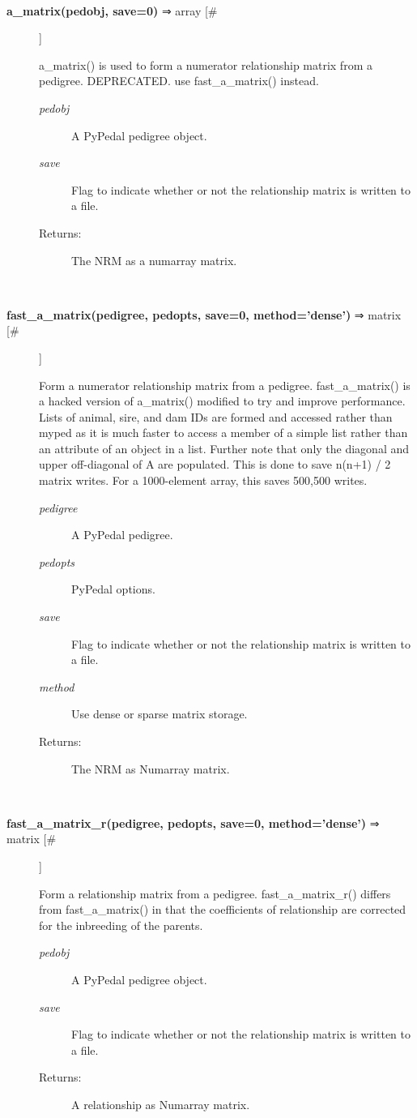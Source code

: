 \documentclass[10pt]{article}
\begin{document}
\begin{description}
\begin{description}
\end{description}
\\ 

\item[\textbf{a\_matrix(pedobj, save=0)}
 ⇒ array [\#]]

 a\_matrix() is used to form a numerator relationship matrix from a pedigree. DEPRECATED. use fast\_a\_matrix() instead.
\begin{description}
\item[\emph{pedobj}
] A PyPedal pedigree object.
\item[\emph{save}
] Flag to indicate whether or not the relationship matrix is written to a file.
\item[Returns:] The NRM as a numarray matrix.

\end{description}
\\ 

\item[\textbf{fast\_a\_matrix(pedigree, pedopts, save=0, method='dense')}
 ⇒ matrix [\#]]

 Form a numerator relationship matrix from a pedigree. fast\_a\_matrix() is a hacked version of a\_matrix() modified to try and improve performance. Lists of animal, sire, and dam IDs are formed and accessed rather than myped as it is much faster to access a member of a simple list rather than an attribute of an object in a list. Further note that only the diagonal and upper off-diagonal of A are populated. This is done to save n(n+1) / 2 matrix writes. For a 1000-element array, this saves 500,500 writes.
\begin{description}
\item[\emph{pedigree}
] A PyPedal pedigree.
\item[\emph{pedopts}
] PyPedal options.
\item[\emph{save}
] Flag to indicate whether or not the relationship matrix is written to a file.
\item[\emph{method}
] Use dense or sparse matrix storage.
\item[Returns:] The NRM as Numarray matrix.

\end{description}
\\ 

\item[\textbf{fast\_a\_matrix\_r(pedigree, pedopts, save=0, method='dense')}
 ⇒ matrix [\#]]

 Form a relationship matrix from a pedigree. fast\_a\_matrix\_r() differs from fast\_a\_matrix() in that the coefficients of relationship are corrected for the inbreeding of the parents.
\begin{description}
\item[\emph{pedobj}
] A PyPedal pedigree object.
\item[\emph{save}
] Flag to indicate whether or not the relationship matrix is written to a file.
\item[Returns:] A relationship as Numarray matrix.


\end{description}
\end{description}
\end{document}
